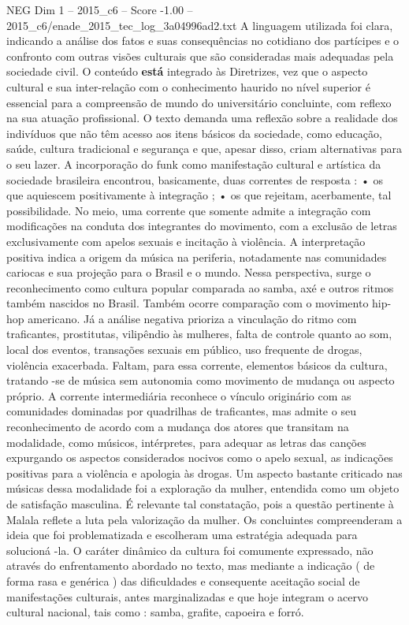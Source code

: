 \begin{textsample}{NEG Dim 1 – 2015\_c6 – Score -1.00 – 2015\_c6/enade\_2015\_tec\_log\_3a04996ad2.txt}
A linguagem utilizada foi clara, indicando a análise dos fatos e suas consequências no cotidiano dos partícipes e o confronto com outras visões culturais que são consideradas mais adequadas pela sociedade civil.
O conteúdo \textbf{está} integrado às Diretrizes, vez que o aspecto cultural e sua inter-relação com o conhecimento haurido no nível superior é essencial para a compreensão de mundo do universitário concluinte, com reflexo na sua atuação profissional.
O texto demanda uma reflexão sobre a realidade dos indivíduos que não têm acesso aos itens básicos da sociedade, como educação, saúde, cultura tradicional e segurança e que, apesar disso, criam alternativas para o seu lazer.
A incorporação do funk como manifestação cultural e artística da sociedade brasileira encontrou, basicamente, duas correntes de resposta : • os que aquiescem positivamente à integração ; • os que rejeitam, acerbamente, tal possibilidade.
No meio, uma corrente que somente admite a integração com modificações na conduta dos integrantes do movimento, com a exclusão de letras exclusivamente com apelos sexuais e incitação à violência.
A interpretação positiva indica a origem da música na periferia, notadamente nas comunidades cariocas e sua projeção para o Brasil e o mundo.
Nessa perspectiva, surge o reconhecimento como cultura popular comparada ao samba, axé e outros ritmos também nascidos no Brasil.
Também ocorre comparação com o movimento hip-hop americano.
Já a análise negativa prioriza a vinculação do ritmo com traficantes, prostitutas, vilipêndio às mulheres, falta de controle quanto ao som, local dos eventos, transações sexuais em público, uso frequente de drogas, violência exacerbada.
Faltam, para essa corrente, elementos básicos da cultura, tratando -se de música sem autonomia como movimento de mudança ou aspecto próprio.
A corrente intermediária reconhece o vínculo originário com as comunidades dominadas por quadrilhas de traficantes, mas admite o seu reconhecimento de acordo com a mudança dos atores que transitam na modalidade, como músicos, intérpretes, para adequar as letras das canções expurgando os aspectos considerados nocivos como o apelo sexual, as indicações positivas para a violência e apologia às drogas.
Um aspecto bastante criticado nas músicas dessa modalidade foi a exploração da mulher, entendida como um objeto de satisfação masculina.
É relevante tal constatação, pois a questão pertinente à Malala reflete a luta pela valorização da mulher.
Os concluintes compreenderam a ideia que foi problematizada e escolheram uma estratégia adequada para solucioná -la.
O caráter dinâmico da cultura foi comumente expressado, não através do enfrentamento abordado no texto, mas mediante a indicação ( de forma rasa e genérica ) das dificuldades e consequente aceitação social de manifestações culturais, antes marginalizadas e que hoje integram o acervo cultural nacional, tais como : samba, grafite, capoeira e forró.

\end{textsample}
